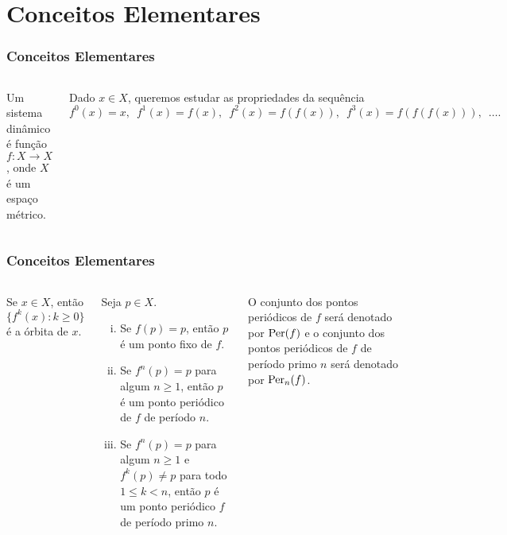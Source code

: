 \section{Conceitos Elementares}


\begin{frame}
\frametitle{Conceitos Elementares}
\begin{columns}
\column{\dimexpr\paperwidth-15pt}

\begin{definition}
Um sistema dinâmico é função $f: X \to X$, onde $X$ é um espaço métrico.
\end{definition}

Dado $x \in X$, queremos estudar as propriedades da sequência
$$f^0(x) = x, \,\,\, f^1(x) = f(x), \,\,\, f^2(x) = f(f(x)), \,\,\, f^3(x) = f(f(f(x))), \,\,\, \dots.$$

\end{columns}
\end{frame}


\begin{frame}
\vspace{5pt}
\frametitle{Conceitos Elementares}      
\begin{columns}
\column{\dimexpr\paperwidth-15pt}

\begin{definition}
Se $x \in X$, então $\lbrace f^k(x) : k \geq 0 \rbrace$ é a órbita de $x$.
\end{definition}

\begin{definition}
Seja $p \in X$.
\begin{enumerate}[i.]
\item Se $f(p) = p$, então $p$ é um ponto fixo de $f$.

\item Se $f^n(p) = p$ para algum $n \geq 1$, então $p$ é um ponto periódico de $f$ de período $n$.

\item Se $f^n(p) = p$ para algum $n \geq 1$ e $f^k(p) \neq p$ para todo $1 \leq k < n$, então $p$ é um ponto periódico $f$ de período primo $n$.
\end{enumerate}
\end{definition}

O conjunto dos pontos periódicos de $f$ será denotado por $\operatorname{Per}(f)$ e o conjunto dos pontos periódicos de $f$ de período primo $n$ será denotado por $\operatorname{Per}_n(f)$.

\end{columns}
\end{frame}

